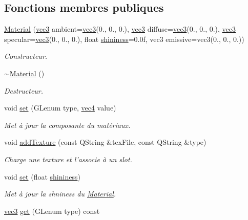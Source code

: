\subsection*{Fonctions membres publiques}
\begin{DoxyCompactItemize}
\item 
\hyperlink{class_material_a1692495b8e704a0ab17701365eb34b0f}{Material} (\hyperlink{structvec3}{vec3} ambient=\hyperlink{structvec3}{vec3}(0., 0., 0.), \hyperlink{structvec3}{vec3} diffuse=\hyperlink{structvec3}{vec3}(0., 0., 0.), \hyperlink{structvec3}{vec3} specular=\hyperlink{structvec3}{vec3}(0., 0., 0.), float \hyperlink{class_material_a9a938aa96f0d5a5dc4d17d43cfd4b42b}{shininess}=0.\+0f, vec3 emissive=vec3(0., 0., 0.))
\begin{DoxyCompactList}\small\item\em Constructeur. \end{DoxyCompactList}\item 
\hyperlink{class_material_a2c19452d71f54075df8f5405b03129f4}{$\sim$\+Material} ()
\begin{DoxyCompactList}\small\item\em Destructeur. \end{DoxyCompactList}\item 
void \hyperlink{class_material_a2ab92e03d9c90294cd28fff9b6a8cde0}{set} (G\+Lenum type, \hyperlink{structvec4}{vec4} value)
\begin{DoxyCompactList}\small\item\em Met à jour la composante du matériaux. \end{DoxyCompactList}\item 
void \hyperlink{class_material_a4f2227a6fb3f12c8618e399f93ab492c}{add\+Texture} (const Q\+String \&tex\+File, const Q\+String \&type)
\begin{DoxyCompactList}\small\item\em Charge une texture et l'associe à un slot. \end{DoxyCompactList}\item 
void \hyperlink{class_material_a3de47a95f13dc6f6306493516814762c}{set} (float \hyperlink{class_material_a9a938aa96f0d5a5dc4d17d43cfd4b42b}{shininess})
\begin{DoxyCompactList}\small\item\em Met à jour la shniness du \hyperlink{class_material}{Material}. \end{DoxyCompactList}\item 
\hyperlink{structvec3}{vec3} \hyperlink{class_material_a6b4b32cf23cbba3988becd840471a51c}{get} (G\+Lenum type) const 

\end{DoxyCompactItemize}
